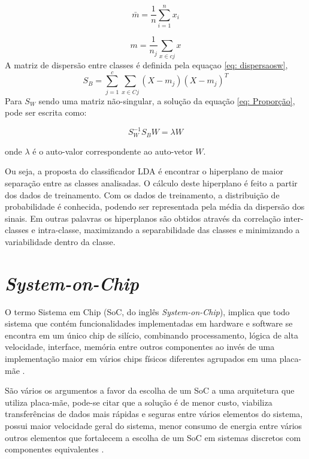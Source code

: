 \begin{equation}
	\label{eq: media}
	\bar m = \frac{1}{n}\sum_{i=1}^{n} {x_i}
\end{equation}

\begin{equation}
	\label{eq: media2}
	m = \frac{1}{n_j}\sum_{x \in c j}^{} x
\end{equation}
A matriz de dispersão entre classes é definida pela equaçao \ref{eq: dispersaosw},
\begin{equation}
	\label{eq: dispersaosw}
	 S_B = \sum_{j=1}^{c} \sum_{x \in C j}{} (X - m_j)(X - m_j)^T 
\end{equation}
Para $S_W$ sendo uma matriz não-singular, a solução da equação 
\ref{eq: Proporção}, pode ser escrita como: 

 \begin{equation}
	\label{eq: final}
	S_W^{-1} S_B W = \lambda W
\end{equation}
 
onde $\lambda$ é o auto-valor correspondente ao auto-vetor $W$.

Ou seja, a proposta do classificador LDA é encontrar o hiperplano de maior separação entre as classes analisadas. O cálculo deste hiperplano é feito a partir dos dados de treinamento. Com os dados de treinamento, a distribuição de probabilidade é conhecida, podendo ser representada pela média da dispersão dos sinais. Em outras palavras os hiperplanos são obtidos através da correlação inter-classes e intra-classe, maximizando a separabilidade das classes e minimizando a variabilidade dentro da classe. 


\section{\textit{System-on-Chip}}

O termo Sistema em Chip (SoC, do inglês \textit{System-on-Chip}), implica que todo sistema que contém funcionalidades implementadas em hardware e software se encontra em um único chip de silício, combinando processamento, lógica de alta velocidade, interface, memória entre outros componentes ao invés de uma implementação maior em vários chips físicos diferentes agrupados em uma placa-mãe \cite{zynqBook}.

São vários os argumentos a favor da escolha de um SoC a uma arquitetura que utiliza placa-mãe, pode-se citar que a solução é de menor custo, viabiliza transferências de dados mais rápidas e seguras entre vários elementos do sistema, possui maior velocidade geral do sistema, menor consumo de energia entre vários outros elementos que fortalecem a escolha de um SoC em sistemas discretos com componentes equivalentes \cite{zynqBook}.

